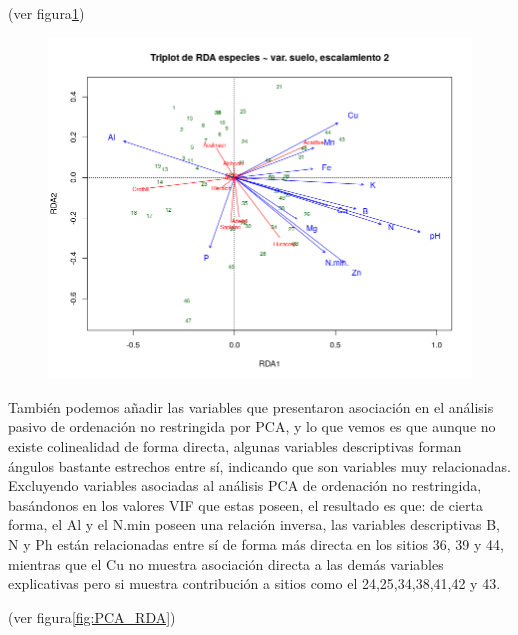\documentclass[11pt,]{article}
\begin{document}
(ver figura\ref{fig:RDA})

\begin{figure}
\centering
\includegraphics{RDA.png}
\caption{\label{fig:RDA}}
\end{figure}

También podemos añadir las variables que presentaron asociación en el
análisis pasivo de ordenación no restringida por PCA, y lo que vemos es
que aunque no existe colinealidad de forma directa, algunas variables
descriptivas forman ángulos bastante estrechos entre sí, indicando que
son variables muy relacionadas. Excluyendo variables asociadas al
análisis PCA de ordenación no restringida, basándonos en los valores VIF
que estas poseen, el resultado es que: de cierta forma, el Al y el N.min
poseen una relación inversa, las variables descriptivas B, N y Ph están
relacionadas entre sí de forma más directa en los sitios 36, 39 y 44,
mientras que el Cu no muestra asociación directa a las demás variables
explicativas pero si muestra contribución a sitios como el
24,25,34,38,41,42 y 43.

(ver figura\ref{fig:PCA_RDA})
\end{document}
